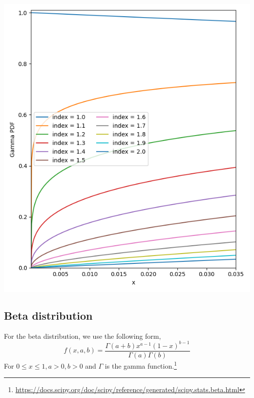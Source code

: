 \hfill
\begin{minipage}[r]{0.48\columnwidth}
	\centering
	\includegraphics[width=\linewidth]{images/gamma}
	\label{fig:gamma_distribution}
\end{minipage}

\subsection{Beta distribution}
\label{subsec:beta-distribution}

For the beta distribution, we use the following form,
\begin{equation}
    f(x, a, b) = \frac{\Gamma(a+b)x^{a-1}(1-x)^{b-1}}{\Gamma(a)\Gamma(b)}
    \label{eq:beta_distribution}
\end{equation}
For $0 \leq x \leq 1, a > 0, b > 0$ and $\Gamma$ is the gamma function.\footnote{\url{https://docs.scipy.org/doc/scipy/reference/generated/scipy.stats.beta.html}}

